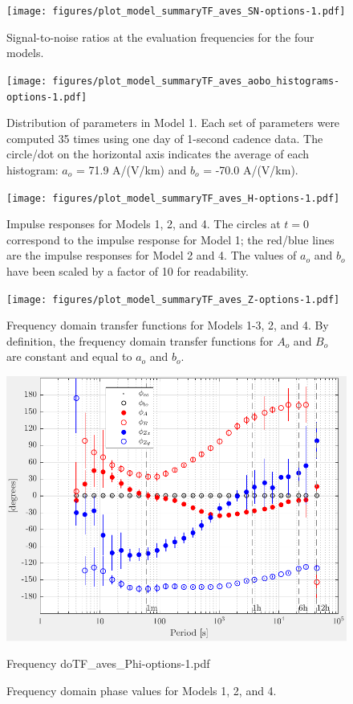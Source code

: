 \documentclass[draft,linenumbers]{agujournal2018}
\begin{document}
\begin{figure}[h]
\centering
\texttt{[image: figures/plot\_model\_summaryTF\_aves\_SN-options-1.pdf]}
\caption{Signal-to-noise ratios at the evaluation frequencies for the four models.}
\label{SN}
\end{figure}

\begin{figure}[h]
\centering
\texttt{[image: figures/plot\_model\_summaryTF\_aves\_aobo\_histograms-options-1.pdf]}
\caption{Distribution of parameters in Model 1. Each set of parameters were computed 35 times using one day of 1-second cadence data. The circle/dot on the horizontal axis indicates the average of each histogram: $a_o$ = 71.9 A/(V/km) and $b_o$ = -70.0 A/(V/km).}
\label{histogram}
\end{figure}

\begin{figure}[h]
\centering
\texttt{[image: figures/plot\_model\_summaryTF\_aves\_H-options-1.pdf]}
\caption{Impulse responses for Models 1, 2, and 4. The circles at $t = 0$ correspond to the impulse response for Model 1; the red/blue lines are the impulse responses for Model 2 and 4. The values of $a_o$ and $b_o$ have been scaled by a factor of 10 for readability.}
\label{H}
\end{figure}

\begin{figure}[h]
\centering
\texttt{[image: figures/plot\_model\_summaryTF\_aves\_Z-options-1.pdf]}
\caption{Frequency domain transfer functions for Models 1-3, 2, and 4. By definition, the frequency domain transfer functions for $A_o$ and $B_o$ are constant and equal to $a_o$ and $b_o$.}
\label{Z}
\end{figure}

\begin{figure}[h]
\centering
\includegraphics[width=\textwidth]{figures/plot_model_summary_Phi-options-1.pdf}
\caption{Frequency doTF_aves_Phi-options-1.pdf}
\caption{Frequency domain phase values for Models 1, 2, and 4.}
\label{Phi}
\end{figure}
\end{document}
